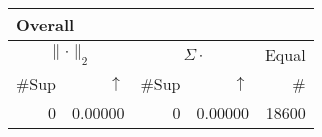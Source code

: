 \begin{center}
\renewcommand{\tabcolsep}{4pt}
\renewcommand{\arraystretch}{1.1}
\begin{customnormal}
\begin{tabular}{rrrrr}
\multicolumn{5}{l}{Overall}\\
\toprule
\multicolumn{2}{c}{$\lVert \cdot \rVert_2$} & \multicolumn{2}{c}{$\Sigma \cdot$} & \multicolumn{1}{c}{Equal} \\ 
\cmidrule(lr){1-2} \cmidrule(lr){3-4} \cmidrule(lr){5-5}
\#Sup & $\uparrow$ & \#Sup & $\uparrow$ & \# \\ 
\midrule
0 & 0.00000  & 0 & 0.00000  & 18600 \\ 
\bottomrule
\end{tabular}


\end{customnormal}
\end{center}


